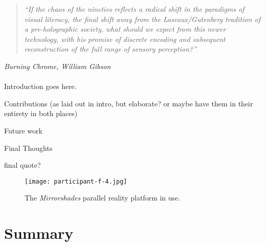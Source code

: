 \begin{quote}
	\textit{``If the chaos of the nineties reflects a radical shift in the paradigms of visual literacy, the final shift away from the Lascaux/Gutenberg tradition of a pre-holographic society, what should we expect from this newer technology, with his promise of discrete encoding and subsequent reconstruction of the full range of sensory perception?''}
\end{quote}
\hfill \textit{Burning Chrome, William Gibson}
\\
\\


Introduction goes here.


Contributions (as laid out in intro, but elaborate? or maybe have them in their entirety in both places)


Future work


Final Thoughts

final quote?




\begin{figure}[h]
	\begin{center}
		\texttt{[image: participant-f-4.jpg]}
		\caption{The \textit{Mirrorshades} parallel reality platform in use.}
		\label{participant-f-4.jpg}
	\end{center}	
\end{figure}










\section{Summary}


